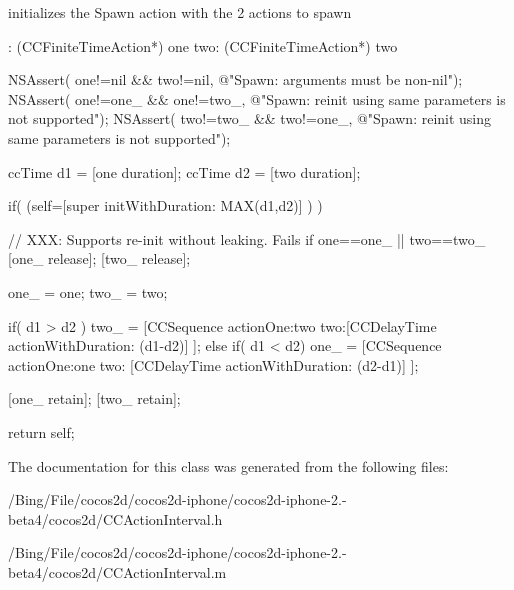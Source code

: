 initializes the Spawn action with the 2 actions to spawn 
\begin{DoxyCode}
             : (CCFiniteTimeAction*) one two: (CCFiniteTimeAction*) two
{
        NSAssert( one!=nil && two!=nil, @"Spawn: arguments must be non-nil");
        NSAssert( one!=one_ && one!=two_, @"Spawn: reinit using same parameters
       is not supported");
        NSAssert( two!=two_ && two!=one_, @"Spawn: reinit using same parameters
       is not supported");

        ccTime d1 = [one duration];
        ccTime d2 = [two duration];

        if( (self=[super initWithDuration: MAX(d1,d2)] ) ) {

                // XXX: Supports re-init without leaking. Fails if one==one_ ||
       two==two_
                [one_ release];
                [two_ release];

                one_ = one;
                two_ = two;

                if( d1 > d2 )
                        two_ = [CCSequence actionOne:two two:[CCDelayTime 
      actionWithDuration: (d1-d2)] ];
                else if( d1 < d2)
                        one_ = [CCSequence actionOne:one two: [CCDelayTime 
      actionWithDuration: (d2-d1)] ];

                [one_ retain];
                [two_ retain];
        }
        return self;
}
\end{DoxyCode}


The documentation for this class was generated from the following files\-:\begin{DoxyCompactItemize}
\item 
/\-Bing/\-File/cocos2d/cocos2d-\/iphone/cocos2d-\/iphone-\/2.-\/beta4/cocos2d/C\-C\-Action\-Interval.\-h\item 
/\-Bing/\-File/cocos2d/cocos2d-\/iphone/cocos2d-\/iphone-\/2.-\/beta4/cocos2d/C\-C\-Action\-Interval.\-m\end{DoxyCompactItemize}
